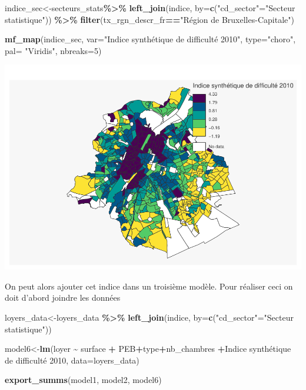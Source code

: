 \documentclass[
]{book}
\newenvironment{Shaded}{\begin{snugshade}}{\end{snugshade}}
\newcommand{\AttributeTok}[1]{\textcolor[rgb]{0.13,0.29,0.53}{#1}}
\newcommand{\DecValTok}[1]{\textcolor[rgb]{0.00,0.00,0.81}{#1}}
\newcommand{\FunctionTok}[1]{\textcolor[rgb]{0.13,0.29,0.53}{\textbf{#1}}}
\newcommand{\NormalTok}[1]{#1}
\newcommand{\OtherTok}[1]{\textcolor[rgb]{0.56,0.35,0.01}{#1}}
\newcommand{\SpecialCharTok}[1]{\textcolor[rgb]{0.81,0.36,0.00}{\textbf{#1}}}
\newcommand{\StringTok}[1]{\textcolor[rgb]{0.31,0.60,0.02}{#1}}
\begin{document}
\begin{Shaded}
\begin{Highlighting}[]
\NormalTok{indice\_sec}\OtherTok{\textless{}{-}}\NormalTok{secteurs\_stats}\SpecialCharTok{\%\textgreater{}\%}
  \FunctionTok{left\_join}\NormalTok{(indice, }\AttributeTok{by=}\FunctionTok{c}\NormalTok{(}\StringTok{"cd\_sector"}\OtherTok{=}\StringTok{"Secteur statistique"}\NormalTok{)) }\SpecialCharTok{\%\textgreater{}\%}
  \FunctionTok{filter}\NormalTok{(tx\_rgn\_descr\_fr}\SpecialCharTok{==}\StringTok{"Région de Bruxelles{-}Capitale"}\NormalTok{)}

\FunctionTok{mf\_map}\NormalTok{(indice\_sec,}
       \AttributeTok{var=}\StringTok{"Indice synthétique de difficulté 2010"}\NormalTok{,}
       \AttributeTok{type=}\StringTok{"choro"}\NormalTok{,}
       \AttributeTok{pal=} \StringTok{"Viridis"}\NormalTok{,}
       \AttributeTok{nbreaks=}\DecValTok{5}\NormalTok{)}
\end{Highlighting}
\end{Shaded}

\includegraphics{bookdown-demo_files/figure-latex/unnamed-chunk-29-1.pdf}

On peut alors ajouter cet indice dans un troisième modèle. Pour réaliser
ceci on doit d'abord joindre les données

\begin{Shaded}
\begin{Highlighting}[]
\NormalTok{loyers\_data}\OtherTok{\textless{}{-}}\NormalTok{loyers\_data }\SpecialCharTok{\%\textgreater{}\%}
  \FunctionTok{left\_join}\NormalTok{(indice, }\AttributeTok{by=}\FunctionTok{c}\NormalTok{(}\StringTok{"cd\_sector"}\OtherTok{=}\StringTok{"Secteur statistique"}\NormalTok{))}

\NormalTok{model6}\OtherTok{\textless{}{-}}\FunctionTok{lm}\NormalTok{(loyer }\SpecialCharTok{\textasciitilde{}}\NormalTok{ surface }\SpecialCharTok{+}\NormalTok{ PEB}\SpecialCharTok{+}\NormalTok{type}\SpecialCharTok{+}\NormalTok{nb\_chambres }\SpecialCharTok{+}\StringTok{\textasciigrave{}}\AttributeTok{Indice synthétique de difficulté 2010}\StringTok{\textasciigrave{}}\NormalTok{, }\AttributeTok{data=}\NormalTok{loyers\_data)}

\FunctionTok{export\_summs}\NormalTok{(model1, model2, model6)}
\end{Highlighting}
\end{Shaded}
\end{document}
